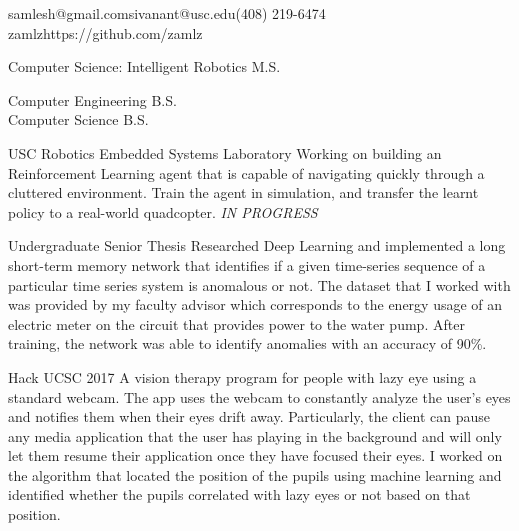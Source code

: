 \documentclass{resume}
\begin{document}
{samlesh@gmail.com}{sivanant@usc.edu}{(408) 219-6474}
{zamlz}{https://github.com/zamlz}


Computer Science: Intelligent Robotics M.S.

Computer Engineering B.S. \\ Computer Science B.S.


{USC Robotics Embedded Systems Laboratory}
{Working on building an Reinforcement Learning agent that is capable of
navigating quickly through a cluttered environment. Train the agent in
simulation, and transfer the learnt policy to a real-world quadcopter.
\textit{IN PROGRESS}}

{Undergraduate Senior Thesis}
{Researched Deep Learning and implemented a long short-term memory
network that identifies if a given time-series sequence of a particular
time series system is anomalous or not. The dataset that I worked with
was provided by my faculty advisor which corresponds to the energy usage
of an electric meter on the circuit that provides power to the water
pump. After training, the network was able to identify anomalies with
an accuracy of 90\%.}

{Hack UCSC 2017}
{A vision therapy program for people with lazy eye using a standard 
webcam. The app uses the webcam to constantly analyze the user's eyes 
and notifies them when their eyes drift away. Particularly, the client
can pause any media application that the user has playing in the 
background and will only let them resume their application once they 
have focused their eyes. I worked on the algorithm that located the
position of the pupils using machine learning and identified whether
the pupils correlated with lazy eyes or not based on that position.}
\end{document}
